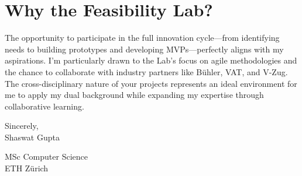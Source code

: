 \documentclass[letterpaper,10pt]{article}
\newcommand{\letterSection}[1]{
  \section*{#1}
  \vspace{-8pt}
}
\begin{document}
\letterSection{Why the Feasibility Lab?}
The opportunity to participate in the full innovation cycle—from identifying needs to building prototypes and developing MVPs—perfectly aligns with my aspirations. I'm particularly drawn to the Lab's focus on agile methodologies and the chance to collaborate with industry partners like Bühler, VAT, and V-Zug. The cross-disciplinary nature of your projects represents an ideal environment for me to apply my dual background while expanding my expertise through collaborative learning.

\vspace{8pt}

{\color{headercolor}
Sincerely,\\[12pt]
Shaswat Gupta
}

\vspace{8pt}
{\color{mutedtext}
MSc Computer Science\\
ETH Zürich
}
\end{document}
